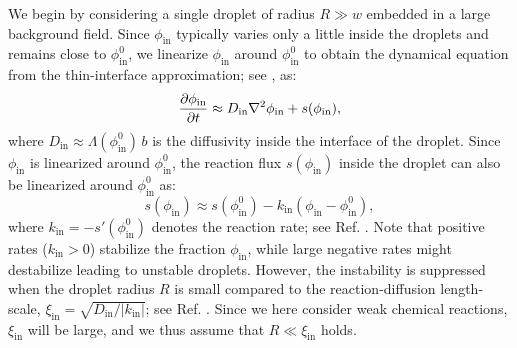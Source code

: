 We begin by considering a single droplet of radius $R \gg w$ embedded in a large background field.
Since $\phi_\mathrm{in}$ typically varies only a little inside the droplets and remains close to $\phi^{0}_\mathrm{in}$, we linearize $\phi_\mathrm{in}$ around $\phi^{0}_\mathrm{in}$ to obtain the dynamical equation from the thin-interface approximation; see , as:
\begin{align} 
    \label{eqn:RD_droplet}
    \frac{\partial \phi_\mathrm{in}}{\partial t}
        \approx D_\mathrm{in} \nabla ^2 \phi_\mathrm{in} +
        s(\phi_\mathrm{in}),
\end{align}
where $D_\mathrm{in} \approx \Lambda(\phi^0_\mathrm{in})\,b$ is the diffusivity inside the interface of the droplet.
Since $\phi_\mathrm{in}$ is linearized around $\phi^{0}_\mathrm{in}$, the reaction flux $s(\phi_\mathrm{in})$ inside the droplet can also be linearized around $\phi^{0}_\mathrm{in}$ as:
\begin{equation*}
    s(\phi_\mathrm{in}) \approx s(\phi^{0}_\mathrm{in}) - k_{\mathrm{in}}(\phi_\mathrm{in} - \phi^{0}_\mathrm{in}),
\end{equation*}
where $k_{\mathrm{in}}= - s'(\phi^{0}_\mathrm{in})$ denotes the reaction rate; see Ref. \cite{Review2019}.
Note that positive rates ($k_\mathrm{in}>0$) stabilize the fraction $\phi_\mathrm{in}$, while large negative rates might destabilize leading to unstable droplets.
However, the instability is suppressed when the droplet radius $R$ is small compared to the reaction-diffusion length-scale, $\xi_\mathrm{in}=\sqrt{D_\mathrm{in}/|k_{\mathrm{in}}|}$; see Ref. \cite{Review2019}.
Since we here consider weak chemical reactions, $\xi_\mathrm{in}$ will be large, and we thus assume that $R \ll \xi_\mathrm{in}$ holds.

